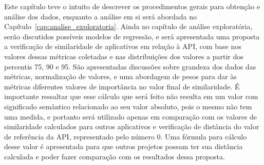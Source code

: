 Este capítulo teve o intuito de descrever os procedimentos gerais para obtenção e análise dos dados, enquanto a análise em si será abordada no Capítulo~\ref{cap:analise_exploratoria}. Ainda no capítulo de análise exploratória, serão discutidos possíveis modelos de regressão, e será apresentada uma proposta a verificação de similaridade de aplicativos em relação à API, com base nos valores dessas métricas coletadas e nas distribuições dos valores a partir dos percentis 75, 90 e 95. São apresentadas discussões sobre grandeza dos dados das métricas, normalização de valores, e uma abordagem de pesos para dar às métricas diferentes valores de importância no valor final de similaridade. É importante ressaltar que esse cálculo que será feito não resulta em um valor com significado semântico relacionado ao seu valor absoluto, pois o mesmo não tem uma medida, e portanto será utilizado apenas em comparação com os valores de similaridade calculados para outros aplicativos e verificação de distância do valor de referência da API, representado pelo número 0. Uma fórmula para cálculo desse valor é apresentada para que outros projetos possam ter sua distância calculada e poder fazer comparação com os resultados dessa proposta.
